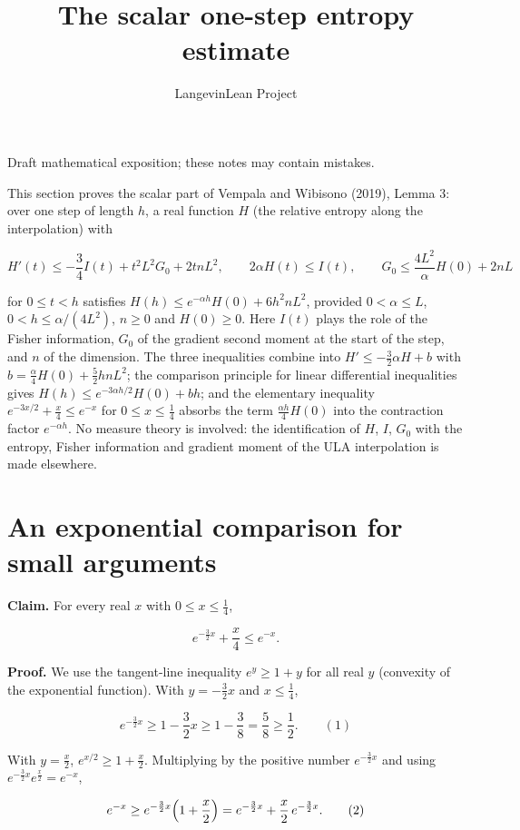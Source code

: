 \documentclass[11pt,a4paper]{article}
\title{\texorpdfstring{The scalar one-step entropy estimate}{The scalar one-step entropy estimate}}
\author{LangevinLean Project}
\date{}
\begin{document}
\maketitle
Draft mathematical exposition; these notes may contain mistakes.


This section proves the scalar part of Vempala and Wibisono (2019), Lemma 3: over one step of length \(h\), a real function \(H\) (the relative entropy along the interpolation) with


\[H'(t)\le-\frac34I(t)+t^2L^2G_0+2tnL^2,\qquad 2\alpha H(t)\le I(t),\qquad G_0\le\frac{4L^2}{\alpha}H(0)+2nL\]


for \(0\le t<h\) satisfies \(H(h)\le e^{-\alpha h}H(0)+6h^2nL^2\), provided \(0<\alpha\le L\), \(0<h\le\alpha/(4L^2)\), \(n\ge0\) and \(H(0)\ge0\). Here \(I(t)\) plays the role of the Fisher information, \(G_0\) of the gradient second moment at the start of the step, and \(n\) of the dimension. The three inequalities combine into \(H'\le-\frac32\alpha H+b\) with \(b=\frac\alpha4H(0)+\frac52hnL^2\); the comparison principle for linear differential inequalities gives \(H(h)\le e^{-3\alpha h/2}H(0)+bh\); and the elementary inequality \(e^{-3x/2}+\frac x4\le e^{-x}\) for \(0\le x\le\frac14\) absorbs the term \(\frac{\alpha h}4H(0)\) into the contraction factor \(e^{-\alpha h}\). No measure theory is involved: the identification of \(H\), \(I\), \(G_0\) with the entropy, Fisher information and gradient moment of the ULA interpolation is made elsewhere.


\section{\texorpdfstring{An exponential comparison for small arguments}{An exponential comparison for small arguments}}


\textbf{Claim.} For every real \(x\) with \(0\le x\le\frac14\),


\[e^{-\frac32x}+\frac x4\le e^{-x}.\]


\textbf{Proof.} We use the tangent-line inequality \(e^y\ge1+y\) for all real \(y\) (convexity of the exponential function). With \(y=-\frac32x\) and \(x\le\frac14\),


\[e^{-\frac32x}\ge1-\frac32x\ge1-\frac38=\frac58\ge\frac12.\qquad(1)\]


With \(y=\frac x2\), \(e^{x/2}\ge1+\frac x2\). Multiplying by the positive number \(e^{-\frac32x}\) and using \(e^{-\frac32x}e^{\frac x2}=e^{-x}\),


\[e^{-x}\ge e^{-\frac32x}\Bigl(1+\frac x2\Bigr)=e^{-\frac32x}+\frac x2\,e^{-\frac32x}.\qquad(2)\]
\end{document}

